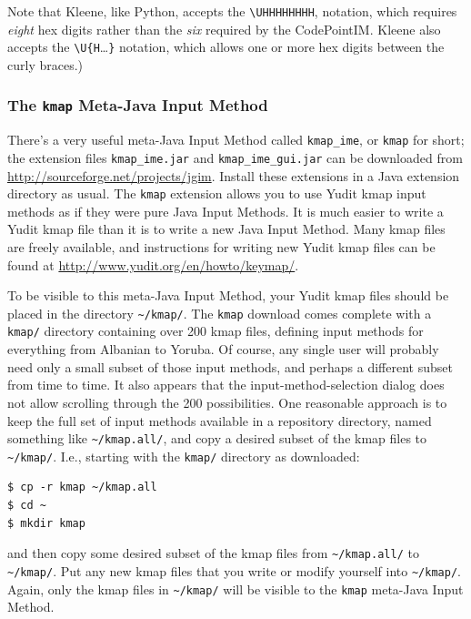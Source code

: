 \documentclass[letterpaper,12pt]{article}
\begin{document}
Note that Kleene, like Python, accepts the \verb!\UHHHHHHHH!, notation,
which requires \emph{eight} hex digits rather than the \emph{six}
required by the CodePointIM.  Kleene also accepts the
\verb!\U{H!\ldots\verb!}! notation, which allows one or more hex digits
between the curly braces.)

\subsubsection{The \texttt{kmap} Meta-Java Input Method}

There's a very useful meta-Java Input Method called \texttt{kmap\_ime},
or \texttt{kmap} for short; the extension files \texttt{kmap\_ime.jar}
and \texttt{kmap\_ime\_gui.jar} can be downloaded from
\url{http://sourceforge.net/projects/jgim}.  Install these extensions in
a Java extension directory as usual.  The \texttt{kmap} extension allows
you to use Yudit kmap input methods as if they were pure Java Input
Methods.  It is much easier to write a Yudit kmap file than it is to
write a new Java Input Method.  Many kmap files are freely available, and
instructions for writing new Yudit kmap files can be found at
\url{http://www.yudit.org/en/howto/keymap/}.

To be visible to this meta-Java Input Method, your Yudit kmap files
should be placed in the directory \texttt{\~{}/kmap/}.  The
\texttt{kmap} download
comes complete with a \texttt{kmap/} directory containing over 200 kmap
files, defining input methods for everything from Albanian to Yoruba.  Of
course, any single user will probably need only a small subset of those
input methods, and perhaps a different subset from time to time.  It also
appears that the input-method-selection dialog does not allow scrolling
through the 200 possibilities.  One reasonable approach is to keep the
full set of input methods available in a repository directory, named
something like \texttt{\~{}/kmap.all/}, and copy a desired subset of the
kmap files  to \texttt{\~{}/kmap/}.  I.e., starting with the
\texttt{kmap/} directory as downloaded:

\begin{Verbatim}[fontsize=\small]
$ cp -r kmap ~/kmap.all
$ cd ~
$ mkdir kmap
\end{Verbatim}

\noindent
and then copy some desired subset of the kmap files from
\texttt{\~{}/kmap.all/} to \texttt{\~{}/kmap/}.  Put any new kmap
files that you write or modify yourself into \texttt{\~{}/kmap/}.  
Again, only the kmap
files in \texttt{\~{}/kmap/} will be visible to the \texttt{kmap} meta-Java Input
Method.
\end{document}
